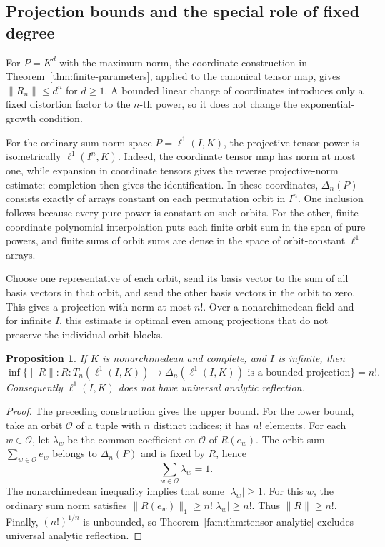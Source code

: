 \documentclass[11pt]{amsart}
\newtheorem{proposition}[theorem]{Proposition}
\theoremstyle{definition}
\theoremstyle{remark}
\numberwithin{equation}{section}
\newcommand{\abs}[1]{\lvert #1\rvert}
\newcommand{\norm}[1]{\lVert #1\rVert}
\begin{document}
\subsection{Projection bounds and the special role of fixed degree}
For $P=K^d$ with the maximum norm, the coordinate construction in
Theorem~\ref{thm:finite-parameters}, applied to the canonical tensor map, gives
$\norm{R_n}\le d^n$ for $d\ge1$. A bounded linear change of coordinates introduces only a fixed
distortion factor to the $n$\nobreakdash-th power, so it does not change the exponential-growth condition.

For the ordinary sum-norm space $P=\ell^1(I,K)$, the projective tensor power is isometrically
$\ell^1(I^n,K)$. Indeed, the coordinate tensor map has norm at most one, while expansion in coordinate
tensors gives the reverse projective-norm estimate; completion then gives the identification.
In these coordinates, $\Delta_n(P)$ consists exactly of arrays constant on each permutation orbit in $I^n$.
One inclusion follows because every pure power is constant on such orbits. For the other, finite-coordinate
polynomial interpolation puts each finite orbit sum in the span of pure powers, and finite sums of orbit
sums are dense in the space of orbit-constant $\ell^1$ arrays.

Choose one representative of each orbit, send its basis vector to the sum of all basis vectors in that
orbit, and send the other basis vectors in the orbit to zero. This gives a projection with norm at most $n!$.
Over a nonarchimedean field and for infinite $I$, this estimate is optimal even among projections that
do not preserve the individual orbit blocks.

\begin{proposition}\label{fam:prop:l1-optimal}
If $K$ is nonarchimedean and complete, and $I$ is infinite, then
\[
 \inf\{\norm R:R\colon T_n(\ell^1(I,K))\to\Delta_n(\ell^1(I,K))
                  \text{ is a bounded projection}\}=n!.
\]
Consequently $\ell^1(I,K)$ does not have universal analytic reflection.
\end{proposition}

\begin{proof}
The preceding construction gives the upper bound. For the lower bound, take an orbit $\mathcal O$
of a tuple with $n$ distinct indices; it has $n!$ elements. For each $w\in\mathcal O$, let $\lambda_w$
be the common coefficient on $\mathcal O$ of $R(e_w)$.
The orbit sum $\sum_{w\in\mathcal O}e_w$ belongs to $\Delta_n(P)$ and is fixed by $R$, hence
\[
 \sum_{w\in\mathcal O}\lambda_w=1.
\]
The nonarchimedean inequality implies that some $\abs{\lambda_w}\ge1$.
For this $w$, the ordinary sum norm satisfies
$\norm{R(e_w)}_1\ge n!\abs{\lambda_w}\ge n!$.
Thus $\norm R\ge n!$. Finally, $(n!)^{1/n}$ is unbounded, so
Theorem~\ref{fam:thm:tensor-analytic} excludes universal analytic reflection.
\end{proof}
\end{document}
